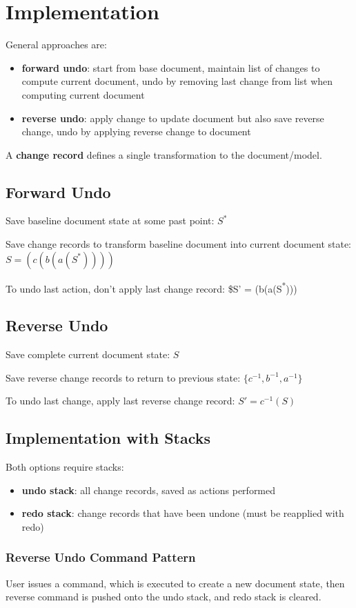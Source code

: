 \documentclass[11pt]{article}
\begin{document}
\section{Implementation}
\label{sec:org5136925}
General approaches are:
\begin{itemize}
\item \textbf{forward undo}: start from base document, maintain list of changes to compute current document,
undo by removing last change from list when computing current document
\item \textbf{reverse undo}: apply change to update document but also save reverse change, undo by applying reverse
change to document
\end{itemize}

A \textbf{change record} defines a single transformation to the document/model.
\subsection{Forward Undo}
\label{sec:org69d6263}
Save baseline document state at some past point: \(S^{*}\)

Save change records to transform baseline document into current document state:
\(S = (c(b(a(S^{*}))))\)

To undo last action, don't apply last change record:
\$S' = (b(a(S\textsuperscript{*})))
\subsection{Reverse Undo}
\label{sec:org77e5abc}
Save complete current document state: \(S\)

Save reverse change records to return to previous state: \(\{c^{-1}, b^{-1}, a^{-1}\}\)

To undo last change, apply last reverse change record: \(S' = c^{-1}(S)\)
\subsection{Implementation with Stacks}
\label{sec:orgfa6ae37}
Both options require stacks:
\begin{itemize}
\item \textbf{undo stack}: all change records, saved as actions performed
\item \textbf{redo stack}: change records that have been undone (must be reapplied with redo)
\end{itemize}
\subsubsection{Reverse Undo Command Pattern}
\label{sec:orgc0199d0}
User issues a command, which is executed to create a new document state, then reverse command is
pushed onto the undo stack, and redo stack is cleared.
\end{document}
